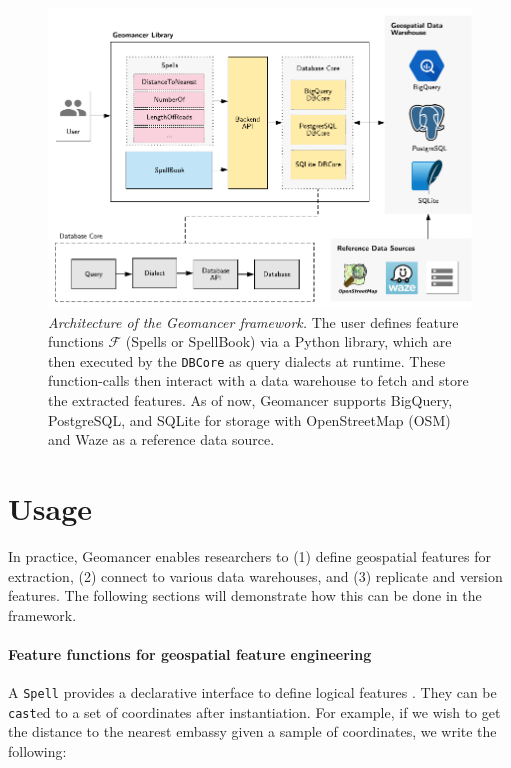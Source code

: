 \documentclass{article}
\begin{document}
\begin{figure}[t]
    \begin{center}
        \includegraphics[width=0.85\linewidth]{architecture.pdf}
    \end{center}
    \caption{
      \textit{Architecture of the Geomancer framework.} The user defines
      feature functions $\mathcal{F}$  (Spells or SpellBook) via a Python
      library, which are then executed by the \texttt{DBCore} as query dialects
      at runtime. These function-calls then interact with a data warehouse to
      fetch and store the extracted features. As of now, Geomancer supports
      BigQuery, PostgreSQL, and SQLite for storage with OpenStreetMap (OSM) and
      Waze as a reference data source. 
    }
  \label{fig:architecture}
\end{figure}

\section{Usage}

In practice, Geomancer enables researchers to (1) define geospatial features
for extraction, (2) connect to various data warehouses, and (3) replicate and
version features.  The following sections will demonstrate how this can be done
in the framework.

\paragraph{Feature functions for geospatial feature engineering}
 A \texttt{Spell} provides a declarative interface to define logical features
 \cite{smith2017ballet}. They can be \texttt{cast}ed to a set of coordinates
 after instantiation.  For example, if we wish to get the distance to the
 nearest embassy given a sample of coordinates, we write the following:
\end{document}
